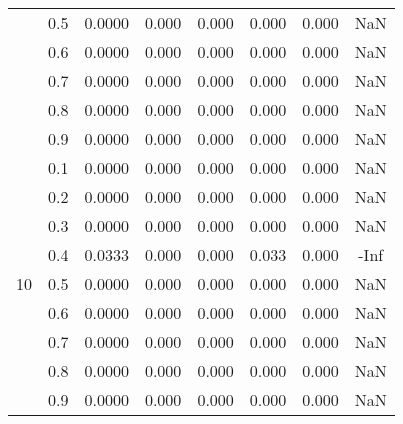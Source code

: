 \documentclass[11pt,a4paper]{report}
\begin{document}
\begin{longtable}{ | c | c || c | c | c | c | c | c | }
 & 0.5 & 0.0000 & 0.000 & 0.000 & 0.000 & 0.000 & NaN \\
 & 0.6 & 0.0000 & 0.000 & 0.000 & 0.000 & 0.000 & NaN \\
 & 0.7 & 0.0000 & 0.000 & 0.000 & 0.000 & 0.000 & NaN \\
 & 0.8 & 0.0000 & 0.000 & 0.000 & 0.000 & 0.000 & NaN \\
 & 0.9 & 0.0000 & 0.000 & 0.000 & 0.000 & 0.000 & NaN \\
 \hline
\multirow{9}{*}{10} & 0.1 & 0.0000 & 0.000 & 0.000 & 0.000 & 0.000 & NaN \\
 & 0.2 & 0.0000 & 0.000 & 0.000 & 0.000 & 0.000 & NaN \\
 & 0.3 & 0.0000 & 0.000 & 0.000 & 0.000 & 0.000 & NaN \\
 & 0.4 & 0.0333 & 0.000 & 0.000 & 0.033 & 0.000 & -Inf \\
 & 0.5 & 0.0000 & 0.000 & 0.000 & 0.000 & 0.000 & NaN \\
 & 0.6 & 0.0000 & 0.000 & 0.000 & 0.000 & 0.000 & NaN \\
 & 0.7 & 0.0000 & 0.000 & 0.000 & 0.000 & 0.000 & NaN \\
 & 0.8 & 0.0000 & 0.000 & 0.000 & 0.000 & 0.000 & NaN \\
 & 0.9 & 0.0000 & 0.000 & 0.000 & 0.000 & 0.000 & NaN \\
 \hline
\hline
\end{longtable}
\end{document}
